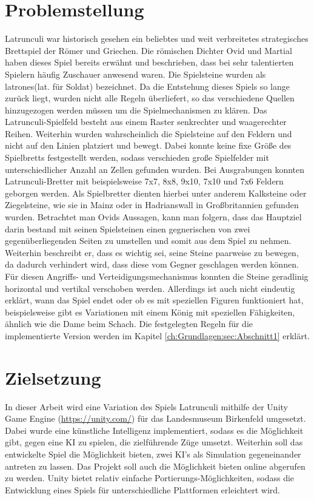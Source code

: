 \section{Problemstellung}
\label{ch:Einleitung:sec:Problemstellung}
Latrunculi war historisch gesehen ein beliebtes und weit verbreitetes strategisches Brettspiel der Römer und Griechen. Die römischen Dichter Ovid und Martial haben dieses Spiel bereits erwähnt und beschrieben, dass bei sehr talentierten Spielern häufig Zuschauer anwesend waren. Die Spielsteine wurden als latrones(lat. für Soldat) bezeichnet. Da die Entstehung dieses Spiels so lange zurück liegt, wurden nicht alle Regeln überliefert, so das verschiedene Quellen hinzugezogen werden müssen um die Spielmechanismen zu klären. Das Latrunculi-Spielfeld besteht aus einem Raster senkrechter und waagerechter Reihen. Weiterhin wurden wahrscheinlich die Spielsteine auf den Feldern und nicht auf den Linien platziert und bewegt. Dabei konnte keine fixe Größe des Spielbretts festgestellt werden, sodass verschieden große Spielfelder mit unterschiedlicher Anzahl an Zellen gefunden wurden. Bei Ausgrabungen konnten Latrunculi-Bretter mit beispielsweise 7x7, 8x8, 9x10, 7x10 und 7x6 Feldern geborgen werden. Als Spielbretter dienten hierbei unter anderem Kalksteine oder Ziegelsteine, wie sie in Mainz oder in Hadrianswall in Großbritannien gefunden wurden. Betrachtet man Ovids Aussagen, kann man folgern, dass das Hauptziel darin bestand mit seinen Spielsteinen einen gegnerischen von zwei gegenüberliegenden Seiten zu umstellen und somit aus dem Spiel zu nehmen. Weiterhin beschreibt er, dass es wichtig sei, seine Steine paarweise zu bewegen, da dadurch verhindert wird, dass diese vom Gegner geschlagen werden können. Für diesen Angriffs- und Verteidigungsmechanismus konnten die Steine geradlinig horizontal und vertikal verschoben werden. Allerdings ist auch nicht eindeutig erklärt, wann das Spiel endet oder ob es mit speziellen Figuren funktioniert hat, beispielsweise gibt es Variationen mit einem König mit speziellen Fähigkeiten, ähnlich wie die Dame beim Schach. Die festgelegten Regeln für die implementierte Version werden im Kapitel \ref{ch:Grundlagen:sec:Abschnitt1} erklärt.

\section{Zielsetzung}
\label{ch:Einleitung:sec:Zielsetzung}
In dieser Arbeit wird eine Variation des Spiels Latrunculi mithilfe der Unity Game Engine (\url{https://unity.com/}) für das Landesmuseum Birkenfeld umgesetzt. Dabei wurde eine künstliche Intelligenz implementiert, sodass es die Möglichkeit gibt, gegen eine KI zu spielen, die zielführende Züge umsetzt. Weiterhin soll das entwickelte Spiel die Möglichkeit bieten, zwei KI's als Simulation gegeneinander antreten zu lassen. Das Projekt soll auch die Möglichkeit bieten online abgerufen zu werden. Unity bietet relativ einfache Portierungs-Möglichkeiten, sodass die Entwicklung eines Spiels für unterschiedliche Plattformen erleichtert wird.


